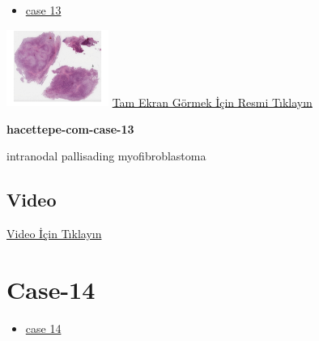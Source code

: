 \documentclass[
  letterpaper,
  DIV=11,
  numbers=noendperiod]{scrreprt}
\providecommand{\tightlist}{%
  \setlength{\itemsep}{0pt}\setlength{\parskip}{0pt}}\usepackage{longtable,booktabs,array}
\begin{document}
\begin{itemize}
\tightlist
\item
  \href{https://www.youtube.com/watch?v=TLRJ0pBrwxA\&ab_channel=KemalKosemehmetoglu}{case
  13}
\end{itemize}

\href{https://images.patolojiatlasi.com/hacettepe-com-case-13/HE.html}{\includegraphics[width=0.25\textwidth,height=\textheight]{./screenshots/thumbnail_hacettepe-com-case-13.png}}
\href{https://images.patolojiatlasi.com/hacettepe-com-case-13/HE.html}{Tam
Ekran Görmek İçin Resmi Tıklayın}

\textbf{hacettepe-com-case-13}

\begin{tcolorbox}[enhanced jigsaw, colbacktitle=quarto-callout-tip-color!10!white, colback=white, titlerule=0mm, opacityback=0, colframe=quarto-callout-tip-color-frame, opacitybacktitle=0.6, bottomrule=.15mm, breakable, coltitle=black, title=\textcolor{quarto-callout-tip-color}{\faLightbulb}\hspace{0.5em}{Tanı}, toprule=.15mm, toptitle=1mm, bottomtitle=1mm, arc=.35mm, rightrule=.15mm, leftrule=.75mm, left=2mm]

intranodal pallisading myofibroblastoma

\end{tcolorbox}

\hypertarget{video-11}{%
\subsection{Video}\label{video-11}}

\href{https://www.youtube.com/watch?v=TLRJ0pBrwxA}{Video İçin Tıklayın}

\hypertarget{sec-hacettepe-case-of-the-month-case-14}{%
\section{Case-14}\label{sec-hacettepe-case-of-the-month-case-14}}

\begin{itemize}
\tightlist
\item
  \href{https://www.youtube.com/watch?v=MVZntjhry6g\&ab_channel=KemalKosemehmetoglu}{case
  14}
\end{itemize}
\end{document}
